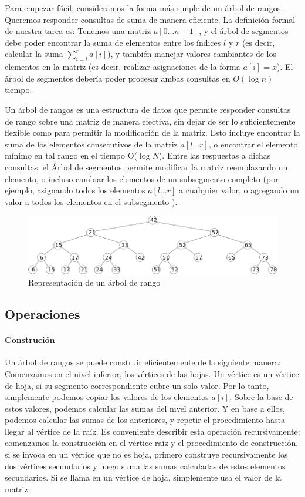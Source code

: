 Para empezar fácil, consideramos la forma más simple de un árbol de rangos.
Queremos responder consultas de suma de manera eficiente. La definición formal de nuestra tarea es: Tenemos una matriz $a[0 \dots n-1]$, y el árbol de segmentos debe poder encontrar la suma de elementos entre los índices $l$ y $r$ (es decir, calcular la suma $\sum_{i= l}^r a[i]$), y también manejar valores cambiantes de los elementos en la matriz (es decir, realizar asignaciones de la forma $a[i] = x$). El árbol de segmentos debería poder procesar ambas consultas en $O(\log n)$ tiempo.

Un árbol de rangos es una estructura de datos que permite responder consultas de rango sobre una matriz de manera efectiva, sin dejar de ser lo suficientemente flexible como para permitir la modificación de la matriz. Esto incluye encontrar la suma de los elementos consecutivos de la matriz $a[l…r]$, o encontrar el elemento mínimo en tal rango en el tiempo O($\log N$). Entre las respuestas a dichas consultas, el Árbol de segmentos permite modificar la matriz reemplazando un elemento, o incluso cambiar los elementos de un subsegmento completo (por ejemplo, asignando todos los elementos $a[l…r]$ a cualquier valor, o agregando un valor a todos los elementos en el subsegmento ).

\begin{figure}[h]
	\centering 
	\includegraphics[scale=0.9]{img/range-tree}
	\caption{Representación de un árbol de rango}
	\label{contexto:figura1}
\end{figure}

\subsection{Operaciones}

\paragraph{Construción}
Un árbol de rangos se puede construir eficientemente de la siguiente manera:
Comenzamos en el nivel inferior, los vértices de las hojas.
Un vértice es un vértice de hoja, si su segmento correspondiente cubre un solo valor. Por lo tanto, simplemente podemos copiar los valores de los elementos $a[i]$. Sobre la base de estos valores, podemos calcular las sumas del nivel anterior. Y en base a ellos, podemos calcular las sumas de los anteriores, y repetir el procedimiento hasta llegar al vértice de la raíz. Es conveniente describir esta operación recursivamente:
comenzamos la construcción en el vértice raíz y el procedimiento de construcción, si se invoca en un vértice que no es hoja, primero construye recursivamente los dos vértices secundarios y luego suma las sumas calculadas de estos elementos secundarios. Si se llama en un vértice de hoja, simplemente usa el valor de la matriz.


